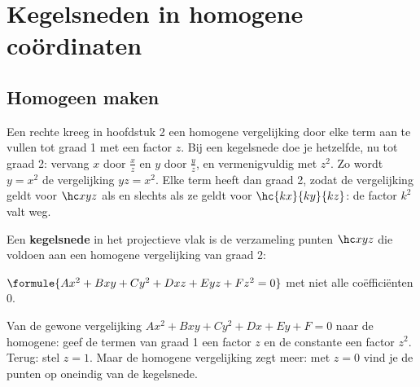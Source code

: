 \begin{oefeningen}[Start]

\end{oefeningen}

\section{Kegelsneden in homogene coördinaten}

\subsection{Homogeen maken}

Een rechte kreeg in hoofdstuk 2 een homogene vergelijking door elke term aan te vullen tot graad 1 met een factor $z$. Bij een kegelsnede doe je hetzelfde, nu tot graad 2: vervang $x$ door $\tfrac xz$ en $y$ door $\tfrac yz$, en vermenigvuldig met $z^2$. Zo wordt $y = x^2$ de vergelijking $yz = x^2$. Elke term heeft dan graad 2, zodat de vergelijking geldt voor $\hc xyz$ als en slechts als ze geldt voor $\hc{kx}{ky}{kz}$: de factor $k^2$ valt weg.

\begin{theorie}
Een \textbf{\textcolor{accent}{kegelsnede}} in het projectieve vlak is de verzameling punten $\hc xyz$ die voldoen aan een homogene vergelijking van graad 2:

\vspace{1mm}
\qquad $\formule{Ax^2 + Bxy + Cy^2 + Dxz + Eyz + Fz^2 = 0}$ \qquad met niet alle coëfficiënten 0.
\end{theorie}

Van de gewone vergelijking $Ax^2 + Bxy + Cy^2 + Dx + Ey + F = 0$ naar de homogene: geef de termen van graad 1 een factor $z$ en de constante een factor $z^2$. Terug: stel $z = 1$. Maar de homogene vergelijking zegt meer: met $z = 0$ vind je de punten op oneindig van de kegelsnede.


